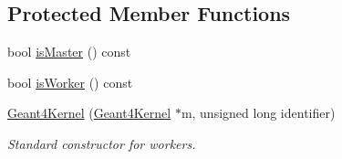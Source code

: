\subsection*{Protected Member Functions}
\begin{DoxyCompactItemize}
\item 
bool \hyperlink{class_d_d4hep_1_1_simulation_1_1_geant4_kernel_ad6a2eb75792e2420a3e1e0fb45222d50}{isMaster} () const 
\item 
bool \hyperlink{class_d_d4hep_1_1_simulation_1_1_geant4_kernel_a44d5244fccf150aa23c93989bd332128}{isWorker} () const 
\item 
\hyperlink{class_d_d4hep_1_1_simulation_1_1_geant4_kernel_ad73b43c4abdbae6586b77ffdb06492d1}{Geant4Kernel} (\hyperlink{class_d_d4hep_1_1_simulation_1_1_geant4_kernel}{Geant4Kernel} $\ast$m, unsigned long identifier)
\begin{DoxyCompactList}\small\item\em Standard constructor for workers. \item\end{DoxyCompactList}\end{DoxyCompactItemize}
